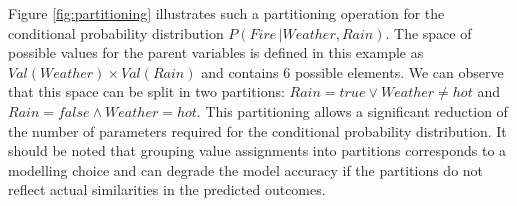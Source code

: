 
Figure \ref{fig:partitioning} illustrates such a partitioning operation for the conditional probability distribution $P(\mathit{Fire} \, | \mathit{Weather}, \mathit{Rain})$.  The space of possible values for the parent variables is defined in this example as $\mathit{Val}(\mathit{Weather}) \times \mathit{Val}(\mathit{Rain})$ and contains 6 possible elements.  We can observe that this space can be split in two partitions: $\mathit{Rain}\!=\mathit{true} \lor \mathit{Weather}\!\neq\mathit{hot}$ and $\mathit{Rain}\!=\mathit{false} \land \mathit{Weather}\!=\mathit{hot}$. This partitioning allows a significant reduction of the number of parameters required for the conditional probability distribution.  It should be noted that grouping value assignments into partitions corresponds to a modelling choice and can degrade the model accuracy if the partitions do not reflect actual similarities in the predicted outcomes.



